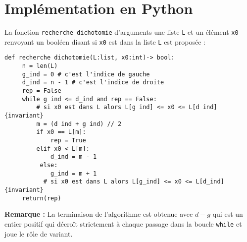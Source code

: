  

\section{Implémentation en Python}


La fonction \lstinline{recherche dichotomie} d'arguments une liste \lstinline{L} et un élément \lstinline{x0} renvoyant un booléen disant si \lstinline{x0} est dans la liste \lstinline{L} est proposée :



\begin{lstlisting}
def recherche dichotomie(L:list, x0:int)-> bool:
     n = len(L)
     g_ind = 0 # c'est l'indice de gauche
     d_ind = n - 1 # c'est l'indice de droite
     rep = False
     while g ind <= d_ind and rep == False:
         # si x0 est dans L alors L[g ind] <= x0 <= L[d ind]     {invariant}
         m = (d ind + g ind) // 2 
         if x0 == L[m]:
             rep = True
         elif x0 < L[m]:
             d_ind = m - 1
          else:
             g_ind = m + 1
           # si x0 est dans L alors L[g_ind] <= x0 <= L[d_ind]     {invariant}
     return(rep)
\end{lstlisting} 



\textbf{Remarque :} La terminaison de l'algorithme est obtenue avec $d-g$ qui est un entier positif qui décro\^{i}t strictement à chaque passage dans la boucle \lstinline{while} et joue le rôle de variant.


